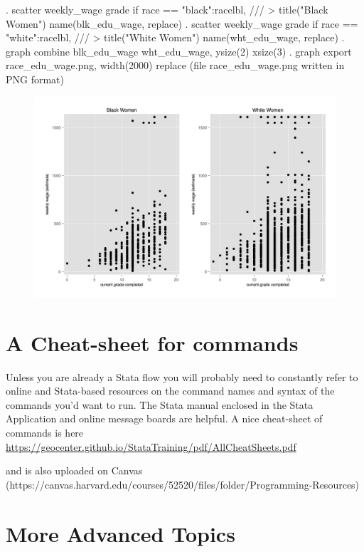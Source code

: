 \documentclass[]{article}
\begin{document}
\begin{stlog}
. scatter weekly_wage grade if race == "black":racelbl, /// 
>    title("Black Women") name(blk_edu_wage, replace) 
{\smallskip}
. scatter weekly_wage grade if race == "white":racelbl, ///
>    title("White Women") name(wht_edu_wage, replace)
{\smallskip}
. graph combine blk_edu_wage wht_edu_wage, ysize(2) xsize(3)
{\smallskip}
. graph export race_edu_wage.png, width(2000) replace
(file race_edu_wage.png written in PNG format)
{\smallskip}
\end{stlog}

\begin{figure}
\centering
\includegraphics[width=1.00000\textwidth]{race_edu_wage.png}
\caption{}
\end{figure}

\section{A Cheat-sheet for commands}\label{a-cheat-sheet-for-commands}

Unless you are already a Stata flow you will probably need to constantly
refer to online and Stata-based resources on the command names and
syntax of the commands you'd want to run. The Stata manual enclosed in
the Stata Application and online message boards are helpful. A nice
cheat-sheet of commands is here
\url{https://geocenter.github.io/StataTraining/pdf/AllCheatSheets.pdf}

and is also uploaded on Canvas
(https://canvas.harvard.edu/courses/52520/files/folder/Programming-Resources)

\section{More Advanced Topics}\label{more-advanced-topics}
\end{document}
